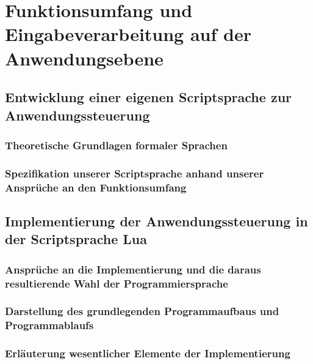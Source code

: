 \documentclass[12pt, a4paper]{scrartcl}
\begin{document}
\section{Funktionsumfang und Eingabeverarbeitung auf der Anwendungsebene}

\subsection{Entwicklung einer eigenen Scriptsprache zur Anwendungssteuerung}
\subsubsection{Theoretische Grundlagen formaler Sprachen}
\subsubsection{Spezifikation unserer Scriptsprache anhand unserer Ansprüche an den Funktionsumfang}

\subsection{Implementierung der Anwendungssteuerung in der Scriptsprache Lua}
\subsubsection{Ansprüche an die Implementierung und die daraus resultierende Wahl der Programmiersprache}
\subsubsection{Darstellung des grundlegenden Programmaufbaus und Programmablaufs}
\subsubsection{Erläuterung wesentlicher Elemente der Implementierung}
\end{document}
